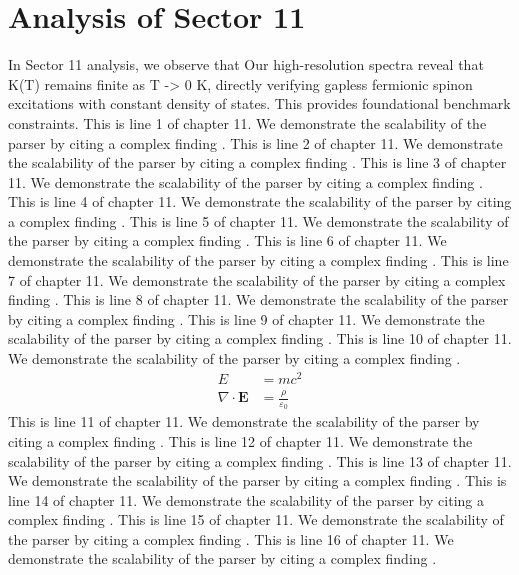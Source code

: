 \chapter{Analysis of Sector 11}

In Sector 11 analysis, we observe that Our high-resolution spectra reveal that K(T) remains finite as T -> 0 K, directly verifying gapless fermionic spinon excitations with constant density of states. This provides foundational benchmark constraints.
This is line 1 of chapter 11. We demonstrate the scalability of the parser by citing a complex finding \cite{ref11_1}.
This is line 2 of chapter 11. We demonstrate the scalability of the parser by citing a complex finding \cite{ref11_2}.
This is line 3 of chapter 11. We demonstrate the scalability of the parser by citing a complex finding \cite{ref11_3}.
This is line 4 of chapter 11. We demonstrate the scalability of the parser by citing a complex finding \cite{ref11_4}.
This is line 5 of chapter 11. We demonstrate the scalability of the parser by citing a complex finding \cite{ref11_5}.
This is line 6 of chapter 11. We demonstrate the scalability of the parser by citing a complex finding \cite{ref11_6}.
This is line 7 of chapter 11. We demonstrate the scalability of the parser by citing a complex finding \cite{ref11_7}.
This is line 8 of chapter 11. We demonstrate the scalability of the parser by citing a complex finding \cite{ref11_8}.
This is line 9 of chapter 11. We demonstrate the scalability of the parser by citing a complex finding \cite{ref11_9}.
This is line 10 of chapter 11. We demonstrate the scalability of the parser by citing a complex finding \cite{ref11_10}.
\begin{align*}
  E &= mc^2 \\
  \nabla \cdot \mathbf{E} &= \frac{\rho}{\varepsilon_0}
\end{align*}
This is line 11 of chapter 11. We demonstrate the scalability of the parser by citing a complex finding \cite{ref11_11}.
This is line 12 of chapter 11. We demonstrate the scalability of the parser by citing a complex finding \cite{ref11_12}.
This is line 13 of chapter 11. We demonstrate the scalability of the parser by citing a complex finding \cite{ref11_13}.
This is line 14 of chapter 11. We demonstrate the scalability of the parser by citing a complex finding \cite{ref11_14}.
This is line 15 of chapter 11. We demonstrate the scalability of the parser by citing a complex finding \cite{ref11_15}.
This is line 16 of chapter 11. We demonstrate the scalability of the parser by citing a complex finding \cite{ref11_16}.
